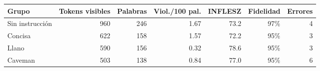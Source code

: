 \begin{tabular}{lrrrrrr}
\toprule
Grupo & Tokens visibles & Palabras & Viol./100 pal. & INFLESZ & Fidelidad & Errores \\
\midrule
Sin instrucción & 960 & 246 & 1.67 & 73.2 & 97\% & 4 \\
Concisa & 622 & 158 & 1.57 & 72.2 & 95\% & 3 \\
Llano & 590 & 156 & 0.32 & 78.6 & 95\% & 3 \\
Caveman & 503 & 138 & 0.84 & 77.0 & 95\% & 6 \\
\bottomrule
\end{tabular}
